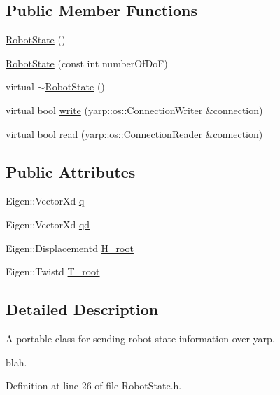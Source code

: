 \subsection*{Public Member Functions}
\begin{DoxyCompactItemize}
\item 
\hyperlink{classocra__recipes_1_1RobotState_ad10e75019e308bb0be22aa545eab0c44}{Robot\+State} ()
\item 
\hyperlink{classocra__recipes_1_1RobotState_ae6462774d46dadc364bc936f61bde768}{Robot\+State} (const int number\+Of\+DoF)
\item 
virtual \hyperlink{classocra__recipes_1_1RobotState_a86cf2dc3aef7d924f89d5b3e5467ea8a}{$\sim$\+Robot\+State} ()
\item 
virtual bool \hyperlink{classocra__recipes_1_1RobotState_aa99fa493c3fe185f2018059f35e56164}{write} (yarp\+::os\+::\+Connection\+Writer \&connection)
\item 
virtual bool \hyperlink{classocra__recipes_1_1RobotState_a98e0e09ec0829542fab9037f6c8f6301}{read} (yarp\+::os\+::\+Connection\+Reader \&connection)
\end{DoxyCompactItemize}
\subsection*{Public Attributes}
\begin{DoxyCompactItemize}
\item 
Eigen\+::\+Vector\+Xd \hyperlink{classocra__recipes_1_1RobotState_aa442f30f43e33d4c5f5d007640d8aaa0}{q}
\item 
Eigen\+::\+Vector\+Xd \hyperlink{classocra__recipes_1_1RobotState_ac45331562cde3f3f67a9f40d71e47c6a}{qd}
\item 
Eigen\+::\+Displacementd \hyperlink{classocra__recipes_1_1RobotState_a296aaf0b3131a7d2c2a82b3b8a4cc583}{H\+\_\+root}
\item 
Eigen\+::\+Twistd \hyperlink{classocra__recipes_1_1RobotState_ae71e2d5ff8976c859921e06a4f35bf25}{T\+\_\+root}
\end{DoxyCompactItemize}


\subsection{Detailed Description}
A portable class for sending robot state information over yarp. 

blah. 

Definition at line 26 of file Robot\+State.\+h.



